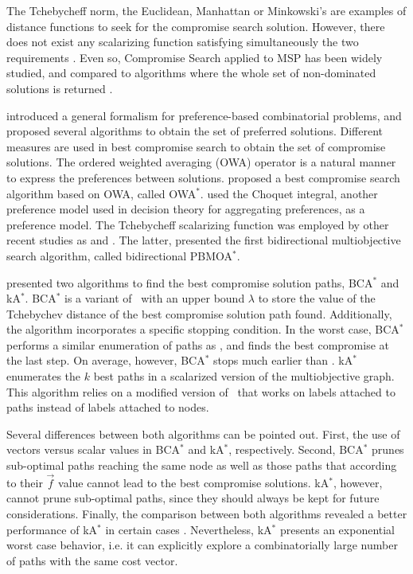 The Tchebycheff norm, the Euclidean, Manhattan or Minkowski's are examples of distance functions to seek for the compromise search solution. However, there does not exist any scalarizing function satisfying simultaneously the two requirements \citep{Wierzbicki1986}. Even so, Compromise Search applied to MSP has been widely studied, and compared to algorithms where the whole set of non-dominated solutions is returned \citep{Machuca2013}.  

\citet{Perny2005} introduced a general formalism for preference-based combinatorial problems, and proposed several algorithms to obtain the set of preferred solutions. Different measures are used in best compromise search to obtain the set of compromise solutions. The ordered weighted averaging (OWA) operator is a natural manner to express the preferences between solutions. \citet{galandspanjaard2007} proposed a best compromise search algorithm based on OWA, called OWA$^*$. \citet{Galand2010} used the Choquet integral, another preference model used in decision theory for aggregating preferences, as a preference model. The Tchebycheff scalarizing function was employed by other recent studies as \citet{Perny2010} and \citet{Galand2013}. The latter, presented the first bidirectional multiobjective search algorithm, called bidirectional PBMOA$^*$.  

\citet{Galand2006} presented two algorithms to find the best compromise solution paths, BCA$^*$ and kA$^*$. BCA$^*$ is a variant of \namoa \ with an upper bound $\lambda$ to store the value of the Tchebychev distance of the best compromise solution path found. Additionally, the algorithm incorporates a specific stopping condition. In the worst case, BCA$^*$ performs a similar enumeration of paths as \namoa, and finds the best compromise at the last step. On average, however, BCA$^*$ stops much earlier than \namoa. kA$^*$ enumerates the $k$ best paths in a scalarized version of the multiobjective graph. This algorithm relies on a modified version of \astar \ that works on labels attached to paths instead of labels attached to nodes. 

Several differences between both algorithms can be pointed out. First, the use of vectors versus scalar values in BCA$^*$ and kA$^*$, respectively. Second, BCA$^*$ prunes sub-optimal paths reaching the same node as well as those paths that according to their $\vec f$ value cannot lead to the best compromise solutions. kA$^*$, however, cannot prune sub-optimal paths, since they should always be kept for future considerations. Finally, the comparison between both algorithms revealed a better performance of kA$^*$ in certain cases \citep{Galand2006,Machuca2013}. Nevertheless, kA$^*$ presents an exponential worst case behavior, i.e. it can explicitly explore a combinatorially large number of paths with the same cost vector. 

